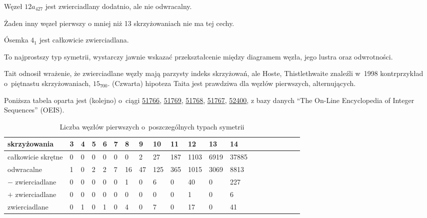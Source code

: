
\begin{example}
    Węzeł $12a_{427}$ jest zwierciadlany dodatnio, ale nie odwracalny.
\end{example}

Żaden inny węzeł pierwszy o mniej niż 13 skrzyżowaniach nie ma tej cechy.

\begin{example}
\label{property_of_eight_knot}%
    Ósemka $4_1$ jest całkowicie zwierciadlana.
\end{example}

To najprostszy typ symetrii, wystarczy jawnie wskazać przekształcenie między diagramem węzła, jego lustra oraz odwrotności.

\label{con:tait_fourth}%
Tait odnosił wrażenie, że zwierciadlane węzły mają parzysty indeks skrzyżowań, ale Hoste, Thistlethwaite znaleźli w~1998 kontrprzykład o~piętnastu skrzyżowaniach, $15_{700}$. %
(Czwarta) hipoteza Taita jest prawdziwa dla węzłów pierwszych, alternujących.
%

Poniższa tabela oparta jest (kolejno) o~ciągi
\href{https://oeis.org/A051766}{51766},
\href{https://oeis.org/A051769}{51769},
\href{https://oeis.org/A051768}{51768},
\href{https://oeis.org/A051767}{51767},
\href{https://oeis.org/A052400}{52400},
z bazy danych ``The On-Line Encyclopedia of Integer Sequences'' (OEIS).

\begin{table}[h]
    \centering
    \begin{tabular}{@{}*{20}l@{}} \toprule
        skrzyżowania & 3 & 4 & 5 & 6 & 7 & 8 & 9 & 10 & 11 & 12 & 13 & 14 \\ \midrule
        całkowicie skrętne & 0 & 0 & 0 & 0 & 0 & 0 & 2 & 27 & 187 & 1103 & 6919 & 37885 \\
        odwracalne & 1 & 0 & 2 & 2 & 7 & 16 & 47 & 125 & 365 & 1015 & 3069 & 8813 \\
        $-$ zwierciadlane & 0 & 0 & 0 & 0 & 0 & 1 & 0 & 6 & 0 & 40 & 0 & 227 \\
        $+$ zwierciadlane & 0 & 0 & 0 & 0 & 0 & 0 & 0 & 0 & 0 & 1 & 0 & 6 \\
        zwierciadlane & 0 & 1 & 0 & 1 & 0 & 4 & 0 & 7 & 0 & 17 & 0 & 41 \\
        \bottomrule
        \hline
    \end{tabular}
    \caption{Liczba węzłów pierwszych o~poszczególnych typach symetrii}
\end{table}

